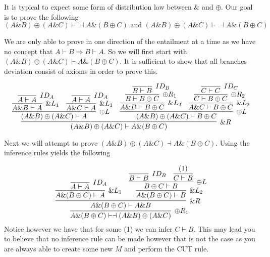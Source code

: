 \documentclass{article}
\begin{document}
It is typical to expect some form of distribution law between \(\& \) and \(\oplus\). Our goal is to prove the following
\[(A \& B) \oplus (A \& C) \vdash \dashv A \& (B \oplus C) \text{ and } (A \& B) \oplus ( A \& C ) \vdash \dashv A \& (B \oplus C)\]

We are only able to prove in one direction of the entailment at a time as we have no concept that \( A \vdash B 	\Rightarrow B \vdash A\). So we will first start with \((A \& B) \oplus (A \& C) \vdash A \& (B \oplus C)\). It is sufficient to show that all branches deviation consist of axioms in order to prove this.

\[
\infer[{\& R}]
    { (A \& B) \oplus (A \& C) \vdash A \& (B \oplus C) }
    {
    \infer[{\oplus L}]
        {(A \& B) \oplus (A \& C) \vdash A }
        {
        \infer[{ \& L_1}]
            {A \& B  \vdash A }
            {
            \infer[{ID_A}]
                {A \vdash A}
                {}
            }
        &
        \infer[{ \& L_1}]
            { A \& C \vdash A}
            {
            \infer[{ ID_A}]
                {A \vdash A}
                {}
            }
        }
    &
    \infer[{\oplus L}]
        {(A \& B) \oplus (A \& C) \vdash  B \oplus C }
        {
        \infer[{\& L_2}]
            {A \& B \vdash  B \oplus C }
            {
            \infer[{\oplus R_1}]
                { B \vdash  B \oplus C }
                {
                \infer[{ID_B}]
                    {B \vdash B}
                    {}
                }
            }
        &
        \infer[{\& L_2}]
            { A \& C \vdash  B \oplus C}
            {
            \infer[{\oplus R_2}]
                { C \vdash  B \oplus C}
                {
                \infer[{ID_C}]
                    {C \vdash  C}
                    {}
                }
            }
        }
    }
\]
    
Next we will attempt to prove \((A \& B) \oplus (A \& C) \dashv A \& (B \oplus C)\). Using the inference rules yields the following

\[
\infer[{\oplus R_1}]
    {A \& (B \oplus C) \vdash \dashv (A \& B) \oplus ( A \& C ) }
    {
    \infer[{\& R}]
        {A \& (B \oplus C) \vdash A \& B }
        {
        \infer[{\& L_1}]
            {A \& (B \oplus C) \vdash A}
            {
            \infer[{ID_A}]
                {A \vdash A}
                {}
            }
        &
        \infer[{\& L_2}]
            { A \& (B \oplus C) \vdash  B}
            {
            \infer[{\oplus L}]
                {B \oplus C \vdash  B}
                {
                \infer[{ID_B}]
                    {B \vdash B}
                    {}
                &
                \infer[{}]
                {C \vdash B}
                {(1)}
                }
            }
        }
    }
\]
Notice however we have that for some (1)  we can infer \(C \vdash B\). This may lead you to believe that no inference rule can be made however that is not the case as you are always able to create some new \(M\) and perform the CUT rule.
\end{document}
